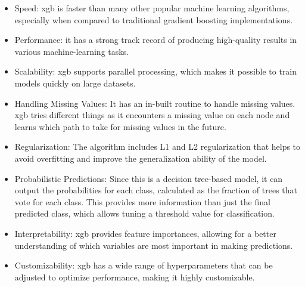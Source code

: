 \begin{itemize}
	\item Speed: \ac{xgb} is faster than many other popular machine learning algorithms, especially when compared to traditional gradient boosting implementations.
	
	\item Performance: it has a strong track record of producing high-quality results in various machine-learning tasks.
	
	\item Scalability: \ac{xgb} supports parallel processing, which makes it possible to train models quickly on large datasets.
	
	\item Handling Missing Values: It has an in-built routine to handle missing values. \ac{xgb} tries different things as it encounters a missing value on each node and learns which path to take for missing values in the future.
	
	\item Regularization: The algorithm includes L1 and L2 regularization that helps to avoid overfitting and improve the generalization ability of the model.
	
	\item Probabilistic Predictions: Since this is a decision tree-based model, it can output the probabilities for each class, calculated as the fraction of trees that vote for each class. This provides more information than just the final predicted class, which allows tuning a threshold value for classification.
	
	\item Interpretability: \ac{xgb} provides feature importances, allowing for a better understanding of which variables are most important in making predictions.
	
	\item Customizability: \ac{xgb} has a wide range of hyperparameters that can be adjusted to optimize performance, making it highly customizable.
\end{itemize}

